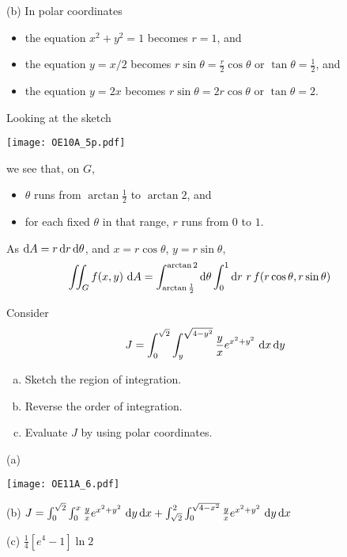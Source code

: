 \begin{solution}
(b) In polar coordinates
\begin{itemize}
\item
the equation $x^2+y^2=1$ becomes $r=1$, and
\item
the equation $y=x/2$ becomes $r\sin\theta = \frac{r}{2}\cos\theta$
or $\tan\theta =\frac{1}{2}$, and
\item
the equation $y=2x$ becomes $r\sin\theta = 2r\cos\theta$
or $\tan\theta =2$.
\end{itemize}
Looking at the sketch
\begin{center}
     \texttt{[image: OE10A\_5p.pdf]}
\end{center}
we see that, on $G$,
\begin{itemize}
\item
$\theta$ runs from $\arctan\frac{1}{2}$ to $\arctan 2$, and
\item
for each fixed $\theta$ in that range, $r$ runs from $0$  to $1$.
\end{itemize}
As $\mathrm{d}A=r\,\mathrm{d}r\,\mathrm{d}\theta$, and $x=r\cos\theta$, $y=r\sin\theta$,
\begin{align*}
\iint_G f(x,y)\ \mathrm{d}A
&=\int_{\arctan\frac{1}{2}}^{\arctan 2}\mathrm{d}\theta
       \int_0^1\mathrm{d}r\ r\,f(r\cos\theta,r\sin\theta)
\end{align*}

\end{solution}


\begin{question}[M200 2011A] %
Consider
\begin{equation*}
J = \int_0^{\sqrt{2}}  \int_y^{\sqrt{4-y^2}}  \frac{y}{x}  e^{x^2+y^2}\
                                            \mathrm{d}x\,\mathrm{d}y
\end{equation*}
\begin{enumerate}[(a)]
\item 
Sketch the region of integration.
\item
Reverse the order of integration.
\item
Evaluate $J$ by using polar coordinates.
\end{enumerate}
\end{question}

%

\begin{answer}
(a)
\begin{center}
     \texttt{[image: OE11A\_6.pdf]}
\end{center}

(b) $J = \int_0^{\sqrt{2}}\int_0^x \frac{y}{x}  e^{x^2+y^2}\ \dee{y}\,\dee{x}
   + \int_{\sqrt{2}}^2\int_0^{\sqrt{4-x^2}} \frac{y}{x}  e^{x^2+y^2}\ 
                                                    \dee{y}\,\dee{x}
    $

(c) $\frac{1}{4}\left[e^4-1\right]\ln 2$
\end{answer}

